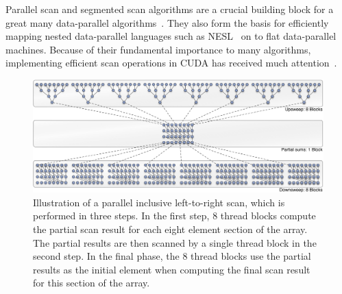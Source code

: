 Parallel scan and segmented scan algorithms are a crucial building block for a
great many data-parallel algorithms~\cite{Blelloch:1990ts,Chatterjee:1990vj}.
They also form the basis for efficiently mapping nested data-parallel languages
such as NESL~\cite{Blelloch:1995ut,Blelloch:1996jx} on to flat data-parallel
machines. Because of their fundamental importance to many algorithms,
implementing efficient scan operations in CUDA\cuda{} has received much
attention~\cite{Sengupta:2007tc,Sengupta:2008ut,Dotsenko:2008fo,Merrill:2009un,Harris:2012fy}.

\begin{figure}
    \begin{center}
        \includegraphics[width=\textwidth]{images/basics/scan}
    \end{center}
    \caption[A parallel inclusive scan]{Illustration of a parallel inclusive
        left-to-right scan, which is performed in three steps. In the first
        step, 8 thread blocks compute the partial scan result for each eight
        element section of the array. The partial results are then scanned by a
        single thread block in the second step. In the final phase, the 8 thread
        blocks use the partial results as the initial element when computing the
        final scan result for this section of the array.}
    \label{fig:fast_scan}
\end{figure}

